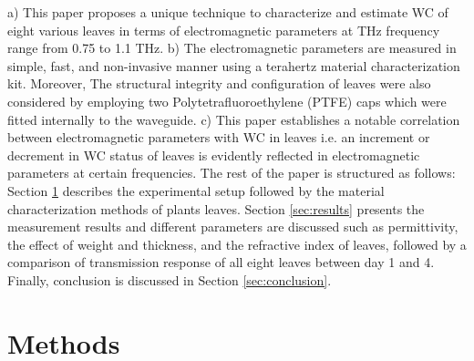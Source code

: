 \documentclass[journal,article,submit,moreauthors,pdftex]{Definitions/mdpi}
\renewcommand{\^}{\hat}  %
\begin{document}
%
%
a) This paper proposes a unique technique to characterize and estimate WC of eight various leaves in terms of electromagnetic parameters at THz frequency range from 0.75 to 1.1 THz.
b) The electromagnetic parameters are measured in simple, fast, and non-invasive manner using a terahertz material characterization kit. Moreover, The structural integrity and configuration of leaves were also considered by employing two Polytetrafluoroethylene (PTFE) caps which were fitted internally to the waveguide.
c) This paper establishes a notable correlation between electromagnetic parameters with WC in leaves i.e. an increment or decrement in WC status of leaves is evidently reflected in electromagnetic parameters at certain frequencies. The rest of the paper is structured as follows: Section \ref{sec:Experimental} describes the experimental setup followed by the material characterization methods of plants leaves. Section \ref{sec:results} presents the measurement results and different parameters are discussed such as permittivity, the effect of weight and thickness, and the refractive index of leaves, followed by a comparison of transmission response of all eight leaves between day 1 and 4. Finally, conclusion is discussed in Section \ref{sec:conclusion}.
\section{Methods}\label{sec:Experimental}
%
\end{document}
